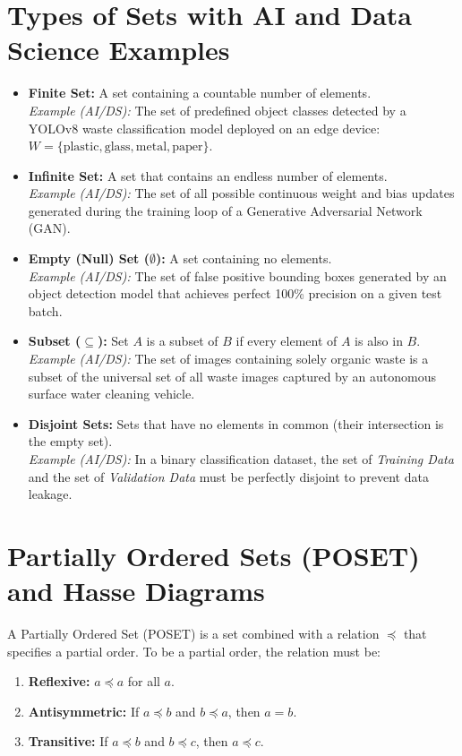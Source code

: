\documentclass[12pt, a4paper]{article}
\begin{document}
\section{Types of Sets with AI and Data Science Examples}
\begin{itemize}
    \item \textbf{Finite Set:} A set containing a countable number of elements. \\
    \textit{Example (AI/DS):} The set of predefined object classes detected by a YOLOv8 waste classification model deployed on an edge device: $W = \{\text{plastic}, \text{glass}, \text{metal}, \text{paper}\}$.
    
    \item \textbf{Infinite Set:} A set that contains an endless number of elements. \\
    \textit{Example (AI/DS):} The set of all possible continuous weight and bias updates generated during the training loop of a Generative Adversarial Network (GAN).
    
    \item \textbf{Empty (Null) Set ($\emptyset$):} A set containing no elements. \\
    \textit{Example (AI/DS):} The set of false positive bounding boxes generated by an object detection model that achieves perfect 100\% precision on a given test batch.
    
    \item \textbf{Subset ($\subseteq$):} Set $A$ is a subset of $B$ if every element of $A$ is also in $B$. \\
    \textit{Example (AI/DS):} The set of images containing solely organic waste is a subset of the universal set of all waste images captured by an autonomous surface water cleaning vehicle.
    
    \item \textbf{Disjoint Sets:} Sets that have no elements in common (their intersection is the empty set). \\
    \textit{Example (AI/DS):} In a binary classification dataset, the set of \textit{Training Data} and the set of \textit{Validation Data} must be perfectly disjoint to prevent data leakage.
\end{itemize}

\vspace{0.5cm}

\section{Partially Ordered Sets (POSET) and Hasse Diagrams}
A Partially Ordered Set (POSET) is a set combined with a relation $\preceq$ that specifies a partial order. To be a partial order, the relation must be:
\begin{enumerate}
    \item \textbf{Reflexive:} $a \preceq a$ for all $a$.
    \item \textbf{Antisymmetric:} If $a \preceq b$ and $b \preceq a$, then $a = b$.
    \item \textbf{Transitive:} If $a \preceq b$ and $b \preceq c$, then $a \preceq c$.
\end{enumerate}
\end{document}
